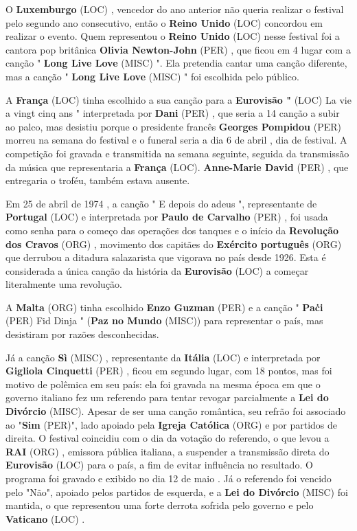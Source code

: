 \documentclass[12pt,a4paper]{article}
\begin{document}
O \textbf{Luxemburgo} (LOC) , vencedor do ano anterior não queria realizar o festival pelo segundo ano consecutivo, então o \textbf{Reino Unido} (LOC) concordou em realizar o evento. Quem representou o \textbf{Reino Unido} (LOC) nesse festival foi a cantora pop britânica \textbf{Olivia Newton-John} (PER) , que ficou em 4 lugar com a canção " \textbf{Long Live Love} (MISC) ". Ela pretendia cantar uma canção diferente, mas a canção " \textbf{Long Live Love} (MISC) " foi escolhida pelo público.

A \textbf{França} (LOC) tinha escolhido a sua canção para a \textbf{Eurovisão "} (LOC) La vie a vingt cinq ans " interpretada por \textbf{Dani} (PER) , que seria a 14 canção a subir ao palco, mas desistiu porque o presidente francês \textbf{Georges Pompidou} (PER) morreu na semana do festival e o funeral seria a dia 6 de abril , dia de festival. A competição foi gravada e transmitida na semana seguinte, seguida da transmissão da música que representaria a \textbf{França} (LOC). \textbf{Anne-Marie David} (PER) , que entregaria o troféu, também estava ausente.

Em 25 de abril de 1974 , a canção " E depois do adeus ", representante de \textbf{Portugal} (LOC) e interpretada por \textbf{Paulo de Carvalho} (PER) , foi usada como senha para o começo das operações dos tanques e o início da \textbf{Revolução dos Cravos} (ORG) , movimento dos capitães do \textbf{Exército português} (ORG) que derrubou a ditadura salazarista que vigorava no país desde 1926. Esta é considerada a única canção da história da \textbf{Eurovisão} (LOC) a começar literalmente uma revolução.

A \textbf{Malta} (ORG) tinha escolhido \textbf{Enzo Guzman} (PER) e a canção " \textbf{Paċi} (PER) Fid Dinja " (\textbf{Paz no Mundo} (MISC)) para representar o país, mas desistiram por razões desconhecidas.

Já a canção \textbf{Sì} (MISC) , representante da \textbf{Itália} (LOC) e interpretada por \textbf{Gigliola Cinquetti} (PER) , ficou em segundo lugar, com 18 pontos, mas foi motivo de polêmica em seu país: ela foi gravada na mesma época em que o governo italiano fez um referendo para tentar revogar parcialmente a \textbf{Lei do Divórcio} (MISC). Apesar de ser uma canção romântica, seu refrão foi associado ao "\textbf{Sim} (PER)", lado apoiado pela \textbf{Igreja Católica} (ORG) e por partidos de direita. O festival coincidiu com o dia da votação do referendo, o que levou a \textbf{RAI} (ORG) , emissora pública italiana, a suspender a transmissão direta do \textbf{Eurovisão} (LOC) para o país, a fim de evitar influência no resultado. O programa foi gravado e exibido no dia 12 de maio . Já o referendo foi vencido pelo "Não", apoiado pelos partidos de esquerda, e a \textbf{Lei do Divórcio} (MISC) foi mantida, o que representou uma forte derrota sofrida pelo governo e pelo \textbf{Vaticano} (LOC) .
\end{document}
